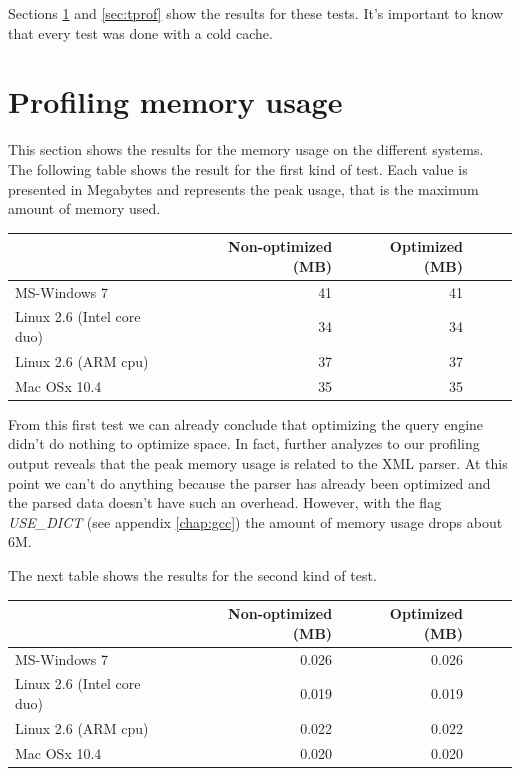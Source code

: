 \documentclass[a4paper]{report}
\begin{document}
	Sections \ref{sec:mprof} and \ref{sec:tprof} show the results for these tests. It's important to know that every test was done with a cold cache.

\section{Profiling memory usage}\label{sec:mprof}
	This section shows the results for the memory usage on the different systems. The following table shows the result for the first kind of test. Each value is presented in Megabytes and represents the peak usage, that is the maximum amount of memory used.

	\begin{center}
  			\begin{tabular}{ | l | r | r | r | r | r | }
			    \hline
				       	       		     			 & Non-optimized (MB) & Optimized (MB)\\ \hline
				    MS-Windows 7   			&  41  & 41  \\ \hline
				    Linux 2.6 (Intel core duo) 	&  34  & 34  \\ \hline
				    Linux 2.6 (ARM cpu)   		&  37  & 37 \\ \hline
				    Mac OSx 10.4   			&  35  & 35 \\
			    \hline
			\end{tabular}
	\end{center}

	From this first test we can already conclude that optimizing the query engine didn't do nothing to optimize space. In fact, further analyzes to our profiling output reveals that the peak memory usage is related to the XML parser. At this point we can't do anything because the parser has already been optimized and the parsed data doesn't have such an overhead. However, with the flag \emph{USE\_DICT} (see appendix \ref{chap:gcc}) the	amount of memory usage drops about 6M.

	The next table shows the results for the second kind of test.

	\begin{center}
  			\begin{tabular}{ | l | r | r | r | r | r | }
			    \hline
				       	       		     			 & Non-optimized (MB) & Optimized (MB)\\ \hline
				    MS-Windows 7   			&  0.026  & 0.026  \\ \hline
				    Linux 2.6 (Intel core duo) 	&  0.019  & 0.019  \\ \hline
				    Linux 2.6 (ARM cpu)   		&  0.022  & 0.022 \\ \hline
				    Mac OSx 10.4   			&  0.020  & 0.020 \\
			    \hline
			\end{tabular}
	\end{center}
\end{document}
